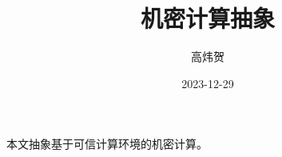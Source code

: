 \documentclass[12pt, letterpaper]{report}
\begin{document}
\title{机密计算抽象}
\author{高炜贺}
\date{2023-12-29}
\maketitle

\newpage

本文抽象基于可信计算环境的机密计算。
\end{document}
